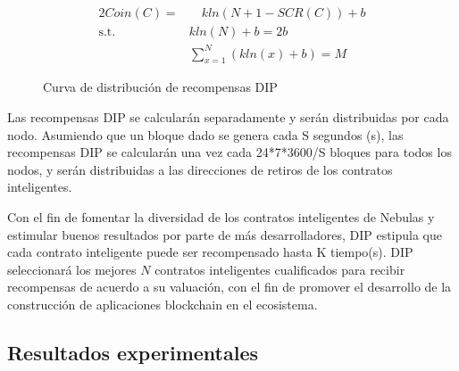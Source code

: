 \begin{alignat}{2}
Coin(C) = & \quad kln(N+1-SCR(C))+b \label{formula:dip} \\
\mbox{s.t.}\quad & kln(N) + b = 2b \nonumber \\
& \sum_{x=1}^{N}(kln(x) + b) = M \nonumber
\end{alignat}

\begin{figure}[h]
\centering
{}
\caption{Curva de distribución de recompensas DIP}
\label{fig:dipdis}
\end{figure}

Las recompensas DIP se calcularán separadamente y serán distribuidas por cada nodo. Asumiendo que un bloque dado se genera cada S segundos (s), las recompensas DIP se calcularán una vez cada 24*7*3600/S bloques para todos los nodos, y serán distribuidas a las direcciones de retiros de los contratos inteligentes.

Con el fin de fomentar la diversidad de los contratos inteligentes de Nebulas y estimular buenos resultados por parte de más desarrolladores, DIP estipula que cada contrato inteligente puede ser recompensado hasta K tiempo(s). DIP seleccionará los mejores $N$ contratos inteligentes cualificados para recibir recompensas de acuerdo a su valuación, con el fin de promover el desarrollo de la construcción de aplicaciones blockchain en el ecosistema.

\subsection{Resultados experimentales}
\label{dip:economic}

